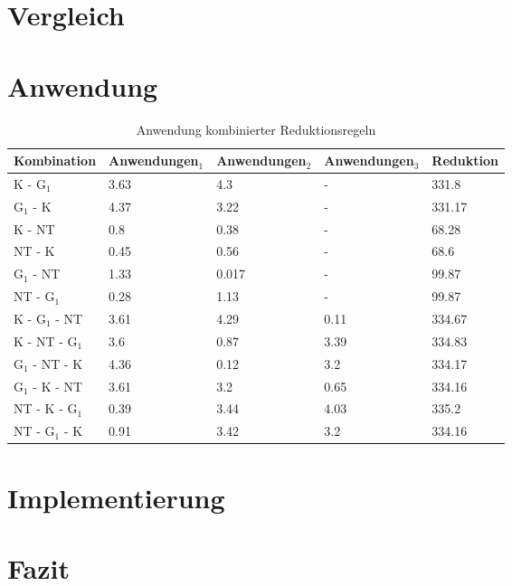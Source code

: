 \documentclass{beamer}
\begin{document}
\section{Vergleich}
\begin{frame}{}
\end{frame}
\section{Anwendung}
\begin{frame}{}
\begin{table}[htbp]
\caption{Anwendung kombinierter Reduktionsregeln\label{tab:kombination}}
\vspace*{1em}
\centering

\bgroup
\def\arraystretch{1.3}%
\tiny
\begin{tabular}[c]{l|l|l|l|l}

	
	\multicolumn{1}{c|}{\textbf{Kombination}} &
	\multicolumn{1}{c|}{\textbf{Anwendungen$_{1}$}} &
	\multicolumn{1}{c|}{\textbf{Anwendungen$_{2}$}} &
	\multicolumn{1}{c|}{\textbf{Anwendungen$_{3}$}} & 
	\multicolumn{1}{c}{\textbf{Reduktion}} \\
	\hline

	K - G$_{1}$ & 3.63 & 4.3 & - &331.8\\
	G$_{1}$ - K & 4.37 & 3.22 & - &331.17\\
	K - NT & 0.8 & 0.38 & - & 68.28 \\
	NT - K & 0.45 & 0.56 & - & 68.6\\
	G$_{1}$ - NT & 1.33 & 0.017 & - & 99.87\\
	NT - G$_{1}$ & 0.28 & 1.13 & - & 99.87\\
	K  - G$_{1}$ - NT & 3.61 & 4.29 & 0.11 & 334.67 \\
	K - NT - G$_{1}$ & 3.6 & 0.87 & 3.39 & 334.83 \\
	G$_{1}$ - NT - K & 4.36 & 0.12 & 3.2 & 334.17 \\
	G$_{1}$ - K - NT & 3.61 & 3.2 & 0.65 & 334.16 \\
	NT - K - G$_{1}$ & 0.39 & 3.44 & 4.03 & 335.2 \\
	NT - G$_{1}$ - K & 0.91 & 3.42 & 3.2 & 334.16 \\

	
\end{tabular}

\egroup

\end{table}
\end{frame}
	
\section{Implementierung}
\begin{frame}{}
\end{frame}

\section{Fazit}
\begin{frame}{}
\end{frame}
  
\end{document}
